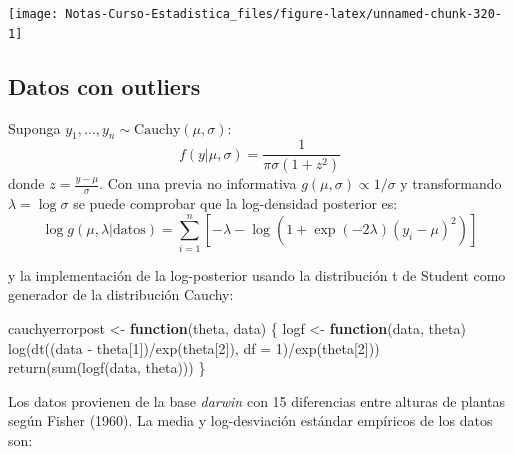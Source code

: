 \documentclass[
  12pt,
]{book}
\newenvironment{Shaded}{\begin{snugshade}}{\end{snugshade}}
\newcommand{\AttributeTok}[1]{\textcolor[rgb]{0.77,0.63,0.00}{#1}}
\newcommand{\ControlFlowTok}[1]{\textcolor[rgb]{0.13,0.29,0.53}{\textbf{#1}}}
\newcommand{\DecValTok}[1]{\textcolor[rgb]{0.00,0.00,0.81}{#1}}
\newcommand{\FunctionTok}[1]{\textcolor[rgb]{0.00,0.00,0.00}{#1}}
\newcommand{\NormalTok}[1]{#1}
\newcommand{\OtherTok}[1]{\textcolor[rgb]{0.56,0.35,0.01}{#1}}
\newcommand{\SpecialCharTok}[1]{\textcolor[rgb]{0.00,0.00,0.00}{#1}}
\begin{document}
\begin{center}\texttt{[image: Notas-Curso-Estadistica\_files/figure-latex/unnamed-chunk-320-1]} \end{center}

\hypertarget{datos-con-outliers}{%
\subsection{Datos con outliers}\label{datos-con-outliers}}

Suponga \(y_1,\ldots,y_n\sim \text{Cauchy}(\mu,\sigma)\):
\[f(y|\mu,\sigma)=\frac{1}{\pi\sigma(1+z^2)}\] donde
\(z=\frac{y-\mu}{\sigma}\). Con una previa no informativa
\(g(\mu,\sigma)\propto 1/\sigma\) y transformando
\(\lambda = \log \sigma\) se puede comprobar que la log-densidad
posterior es:
\[\log g(\mu,\lambda|\text{datos}) = \sum_{i=1}^n\left[-\lambda-\log\left(1+\exp(-2\lambda)(y_i-\mu)^2\right)\right]\]

y la implementación de la log-posterior usando la distribución t de
Student como generador de la distribución Cauchy:

\begin{Shaded}
\begin{Highlighting}[]
\NormalTok{cauchyerrorpost }\OtherTok{\textless{}{-}} \ControlFlowTok{function}\NormalTok{(theta, data) \{}
\NormalTok{    logf }\OtherTok{\textless{}{-}} \ControlFlowTok{function}\NormalTok{(data, theta) }\FunctionTok{log}\NormalTok{(}\FunctionTok{dt}\NormalTok{((data }\SpecialCharTok{{-}}\NormalTok{ theta[}\DecValTok{1}\NormalTok{])}\SpecialCharTok{/}\FunctionTok{exp}\NormalTok{(theta[}\DecValTok{2}\NormalTok{]),}
        \AttributeTok{df =} \DecValTok{1}\NormalTok{)}\SpecialCharTok{/}\FunctionTok{exp}\NormalTok{(theta[}\DecValTok{2}\NormalTok{]))}
    \FunctionTok{return}\NormalTok{(}\FunctionTok{sum}\NormalTok{(}\FunctionTok{logf}\NormalTok{(data, theta)))}
\NormalTok{\}}
\end{Highlighting}
\end{Shaded}

Los datos provienen de la base \emph{darwin} con 15 diferencias entre
alturas de plantas según Fisher (1960). La media y log-desviación
estándar empíricos de los datos son:

\begin{Shaded}
\end{Shaded}
\end{document}
